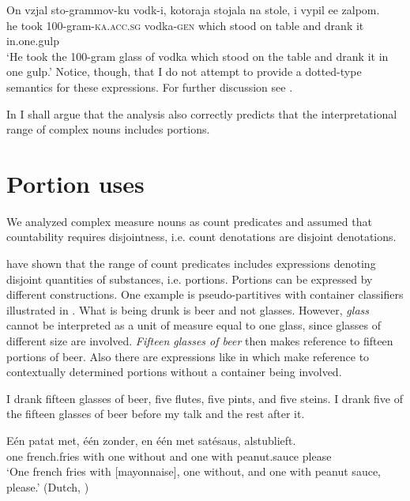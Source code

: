 \documentclass[output=paper,
colorlinks,
citecolor=brown,
newtxmath
]{langscibook}
\begin{document}
{    \ea\label{f:4} \gll On vzjal sto-grammov-ku vodk-i, kotoraja stojala na stole, i vypil ee zalpom.\\
    he took 100-gram-\textsc{ka.acc.sg} vodka-\textsc{gen} which stood on table and drank it in.one.gulp\\
    \glt `He took the 100-gram glass of vodka which stood on the table and drank it in one gulp.'
    \z
Notice, though, that I do not attempt to provide a dotted-type semantics for these expressions. For further discussion see \citet{Partee.Borschev2012}.
    }

In  I shall argue that the analysis also correctly predicts that the interpretational range of complex nouns includes portions.

%
%
\section{Portion uses}\label{sec:5}

We analyzed complex measure nouns as count predicates and assumed that countability requires disjointness, i.e. count denotations are disjoint denotations.

\citet{Khrizman.etal2015} have shown that the range of count predicates includes expressions denoting disjoint quantities of substances, i.e. portions. Portions can be expressed by different constructions. One example is pseudo-partitives with container classifiers illustrated in . What is being drunk is beer and not glasses. However, \textit{glass} cannot be interpreted as a unit of measure equal to one glass, since glasses of different size are involved. \textit{Fifteen glasses of beer} then makes reference to fifteen portions of beer. Also there are expressions like in  which make reference to contextually determined portions without a container being involved.

    \largerpage[-1] %

\ea\label{ex:35} I drank fifteen glasses of beer, five flutes, five pints, and five steins. I drank five of the fifteen glasses of beer before my talk and the rest after it. \hfill \citep[202]{Khrizman.etal2015}
\z

\ea\label{ex:36} \gll Eén patat met, één zonder, en één met satésaus, alstublieft.\\
one french.fries with one without and one with peanut.sauce please\\
\glt `One french fries with [mayonnaise], one without, and one with peanut sauce, please.' \hfill (Dutch, \citealt[200]{Khrizman.etal2015})
\z
\end{document}
